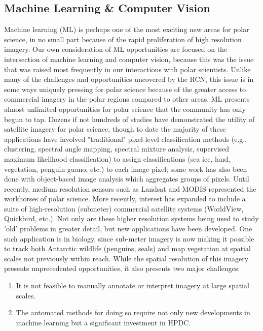 \documentclass[10pt,letterpaper,draft]{article}
\begin{document}
\subsection*{Machine Learning & Computer Vision}
Machine learning (ML) is perhaps one of the most exciting new areas for polar science, in no small part because of the rapid proliferation of high resolution imagery. Our own consideration of ML opportunities are focused on the intersection of machine learning and computer vision, because this was the issue that was raised most frequently in our interactions with polar scientists. Unlike many of the challenges and opportunities uncovered by the RCN, this issue is in some ways uniquely pressing for polar science because of the greater access to commercial imagery in the polar regions compared to other areas. ML presents almost unlimited opportunities for polar science that the community has only begun to tap. 
Dozens if not hundreds of studies have demonstrated the utility of satellite imagery for polar science, though to date the majority of these applications have involved "traditional" pixel-level classification methods (e.g., clustering, spectral angle mapping, spectral mixture analysis, supervised maximum likelihood classification) to assign classifications (sea ice, land, vegetation, penguin guano, etc.) to each image pixel; some work has also been done with object-based image analysis which aggregates groups of pixels. Until recently, medium resolution sensors such as Landsat and MODIS represented the workhorses of polar science.
More recently, interest has expanded to include a suite of high-resolution (submeter) commercial satellite systems (WorldView, Quickbird, etc.). Not only are these higher resolution systems being used to study 'old' problems in greater detail, but new applications have been developed. One such application is in biology, since sub-meter imagery is now making it possible to track both Antarctic wildlife (penguins, seals) and map vegetation at spatial scales not previously within reach. While the spatial resolution of this imagery presents unprecedented opportunities, it also presents two major challenges:
\begin{enumerate}
    \item It is not feasible to manually annotate or interpret imagery at large spatial scales.
    \item The automated methods for doing so require not only new developments in machine learning but a significant investment in HPDC.
\end{enumerate}
\end{document}
